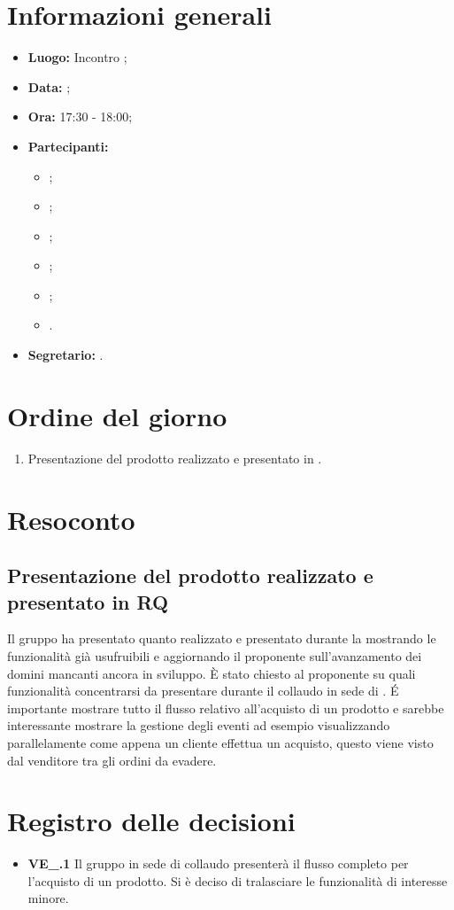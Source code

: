 \section{Informazioni generali}
\begin{itemize}
\item \textbf{Luogo:} Incontro ;
\item \textbf{Data:} \Data;
\item \textbf{Ora:} 17:30 - 18:00;
\item \textbf{Partecipanti:}
	\begin{itemize}
		\item \BL{}; 
		\item \FF{};
		\item \MM{};
		\item \TL{};
		\item \PC;
		\item \Proponente{}.
	\end{itemize}
\item \textbf{Segretario:} \FF{}.
\end{itemize}

\section{Ordine del giorno}
\begin{enumerate}
	\item Presentazione del prodotto realizzato e presentato in .
\end{enumerate}

\section{Resoconto}
\subsection{Presentazione del prodotto realizzato e presentato in RQ}
Il gruppo ha presentato quanto realizzato e presentato durante la  mostrando le funzionalità già usufruibili e aggiornando il proponente sull'avanzamento dei domini mancanti ancora in sviluppo. È stato chiesto al proponente su quali funzionalità concentrarsi da presentare durante il collaudo in sede di . É importante mostrare tutto il flusso relativo all'acquisto di un prodotto e sarebbe interessante mostrare la gestione degli eventi ad esempio visualizzando parallelamente come appena un cliente effettua un acquisto, questo viene visto dal venditore tra gli ordini da evadere.  

\section{Registro delle decisioni}
\begin{itemize}
	\item \textbf{VE\_\Data.1} Il gruppo in sede di collaudo presenterà il flusso completo per l'acquisto di un prodotto. Si è deciso di tralasciare le funzionalità di interesse minore.
\end{itemize}